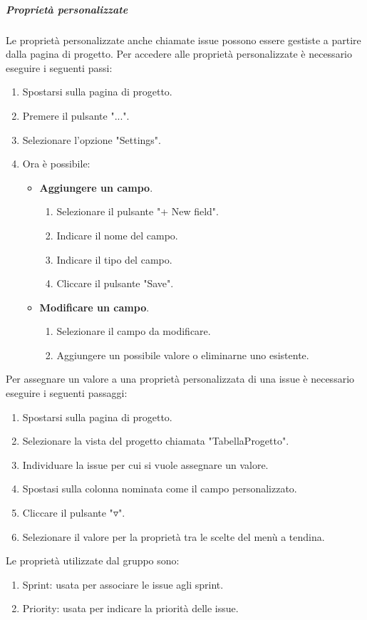 \subparagraph{Proprietà personalizzate}
\label{subpar:proprietà_personalizzate}
Le proprietà personalizzate anche chiamate issue possono essere gestiste a partire dalla pagina di progetto.
Per accedere alle proprietà personalizzate è necessario eseguire i seguenti passi:
\begin{enumerate}
    \item Spostarsi sulla pagina di progetto.
    \item Premere il pulsante "...".
    \item Selezionare l'opzione "Settings".
    \item Ora è possibile:
    \begin{itemize}
        \item \textbf{Aggiungere un campo}.
        \begin{enumerate}
            \item Selezionare il pulsante "+ New field".
            \item Indicare il nome del campo.
            \item Indicare il tipo del campo.
            \item Cliccare il pulsante "Save".
        \end{enumerate}

        \item \textbf{Modificare un campo}.
        \begin{enumerate}
            \item  Selezionare il campo da modificare.
            \item Aggiungere un possibile valore o eliminarne uno esistente.
        \end{enumerate}
    \end{itemize}
\end{enumerate}
Per assegnare un valore a una proprietà personalizzata di una issue è necessario eseguire i seguenti passaggi:
\begin{enumerate}
    \item Spostarsi sulla pagina di progetto.
    \item Selezionare la vista del progetto chiamata "TabellaProgetto".
    \item Individuare la issue per cui si vuole assegnare un valore.
    \item Spostasi sulla colonna nominata come il campo personalizzato.
    \item Cliccare il pulsante "$\triangledown$".
    \item Selezionare il valore per la proprietà tra le scelte del menù a tendina.
\end{enumerate}
Le proprietà utilizzate dal gruppo sono:
\begin{enumerate}
    \item Sprint: usata per associare le issue agli sprint.
    \item Priority: usata per indicare la priorità delle issue.
\end{enumerate}


